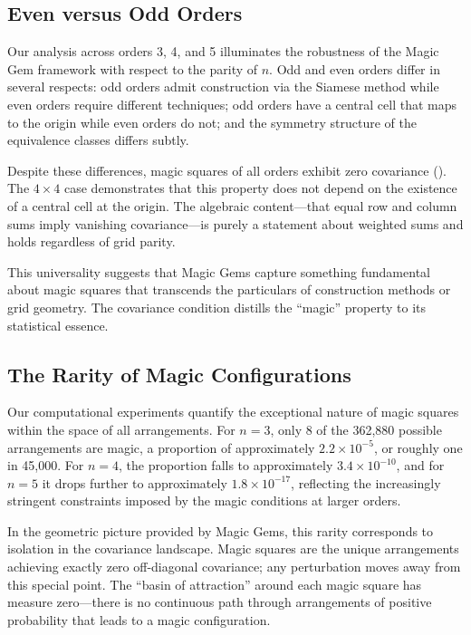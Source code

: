 \subsection{Even versus Odd Orders}

Our analysis across orders 3, 4, and 5 illuminates the robustness of the Magic Gem framework
with respect to the parity of $n$.
Odd and even orders differ in several respects:
odd orders admit construction via the Siamese method while even orders require different techniques;
odd orders have a central cell that maps to the origin while even orders do not;
and the symmetry structure of the equivalence classes differs subtly.

Despite these differences, magic squares of all orders exhibit zero covariance ().
The $4 \times 4$ case demonstrates that this property does not depend on
the existence of a central cell at the origin.
The algebraic content---that equal row and column sums imply vanishing covariance---is 
purely a statement about weighted sums and holds regardless of grid parity.

This universality suggests that Magic Gems capture something fundamental about magic squares
that transcends the particulars of construction methods or grid geometry.
The covariance condition distills the ``magic'' property to its statistical essence.

\subsection{The Rarity of Magic Configurations}

Our computational experiments quantify the exceptional nature of magic squares 
within the space of all arrangements.
For $n = 3$, only 8 of the 362,880 possible arrangements are magic,
a proportion of approximately $2.2 \times 10^{-5}$, or roughly one in 45,000.
For $n = 4$, the proportion falls to approximately $3.4 \times 10^{-10}$,
and for $n = 5$ it drops further to approximately $1.8 \times 10^{-17}$,
reflecting the increasingly stringent constraints imposed by the magic conditions at larger orders.

In the geometric picture provided by Magic Gems, this rarity corresponds to isolation in the covariance landscape.
Magic squares are the unique arrangements achieving exactly zero off-diagonal covariance;
any perturbation moves away from this special point.
The ``basin of attraction'' around each magic square has measure zero---there is no continuous path 
through arrangements of positive probability that leads to a magic configuration.

